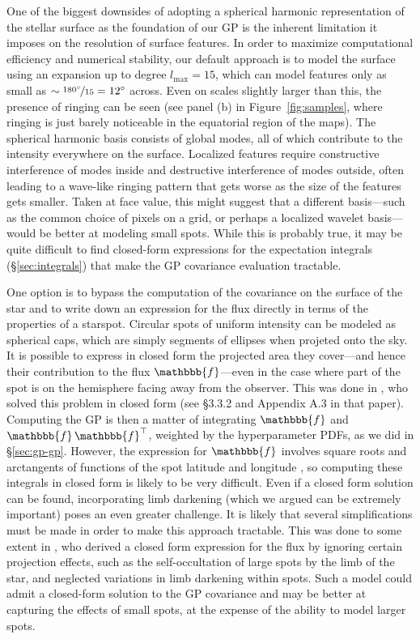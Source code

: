 \documentclass[modern,linenumbers]{aastex62}
\begin{document}
One of the biggest downsides of adopting a spherical harmonic representation
of the stellar surface as the foundation of our GP is the inherent limitation
it imposes on the resolution of surface features. In order to maximize
computational efficiency and numerical stability, our default approach is to
model the surface using an expansion up to degree $l_\mathrm{max} = 15$,
which can model features only as small as
$\sim \nicefrac{180^\circ}{15} = 12^\circ$ across. Even on scales
slightly larger than this, the presence of ringing can be seen
(see panel (b) in Figure~\ref{fig:samples}, where ringing is just barely
noticeable in the equatorial region of the maps). The spherical harmonic basis consists
of global modes, all of which contribute to the intensity everywhere on the surface.
Localized features require constructive interference of modes inside
and destructive interference of modes outside, often leading to a wave-like ringing
pattern that gets worse as the size of the features gets smaller. Taken at
face value, this might suggest that a different basis---such as the common
choice of pixels on a grid, or perhaps a localized wavelet basis---would be better
at modeling small spots. While this is probably true, it may be quite
difficult to find closed-form expressions for the expectation integrals
(\S\ref{sec:integrals}) that make the GP covariance evaluation tractable.

One option is to bypass the computation of the covariance on the surface of
the star and to write down an expression for the flux directly in terms of
the properties of a starspot. Circular spots of uniform intensity can be
modeled as spherical caps, which are simply segments of ellipses when
projeted onto the sky. It is possible to express in closed form the projected area
they cover---and hence their contribution to the flux $\mathbbb{f}$---even in the case
where part of the spot is on the hemisphere facing away from the observer.
This was done in \citet{Luger2017}, who solved this problem in closed form
(see \S3.3.2 and Appendix A.3 in that paper). Computing the GP is then a matter of
integrating $\mathbbb{f}$ and $\mathbbb{f}\,\mathbbb{f}^\top$, weighted by
the hyperparameter PDFs, as we did in \S\ref{sec:gp-gp}.
However, the expression for
$\mathbbb{f}$ involves square roots and arctangents of functions of the spot
latitude and longitude
\citep[see Equation~40 in][]{Luger2017},
so computing these integrals in closed form is
likely to be very difficult. Even if a closed form solution can be found,
incorporating limb darkening (which we argued can be extremely important)
poses an even greater challenge. It is likely that several simplifications
must be made in order to make this approach tractable. This was done to some
extent in \citet{Morris2020}, who derived a closed form expression for the flux by
ignoring certain projection effects, such
as the self-occultation of large spots by the limb of the star, and neglected
variations in limb darkening within spots. Such a model could admit a closed-form
solution to the GP covariance and may be better at capturing the effects
of small spots, at the expense of the ability to model larger spots.
\end{document}
